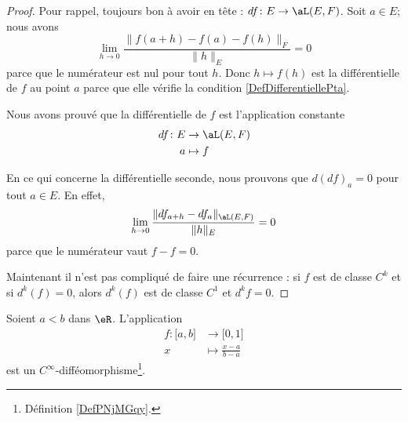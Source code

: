\begin{proof}
	Pour rappel, toujours bon à avoir en tête : \( df\colon E\to \aL(E,F)\). Soit \( a\in E\); nous avons
	\begin{equation}
		\lim_{h\to 0} \frac{ \| f(a+h)-f(a)- f(h) \|_F }{ \| h \|_E }=0
	\end{equation}
	parce que le numérateur est nul pour tout \( h\). Donc \( h\mapsto f(h)\) est la différentielle de \( f\) au point \( a\) parce que elle vérifie la condition \eqref{DefDifferentiellePta}.

	Nous avons prouvé que la différentielle de \( f\) est l'application constante
	\begin{equation}
		\begin{aligned}
			df\colon E & \to \aL(E,F) \\
			a          & \mapsto f
		\end{aligned}
	\end{equation}

	En ce qui concerne la différentielle seconde, nous prouvons que \( d(df)_a=0\) pour tout \( a\in E\). En effet,
	\begin{equation}
		\lim_{h\to 0} \frac{ \| df_{a+h}-df_a \|_{\aL(E,F)} }{ \| h \|_E }=0
	\end{equation}
	parce que le numérateur vaut \( f-f=0\).

	Maintenant il n'est pas compliqué de faire une récurrence : si \( f\) est de classe \( C^k\) et si \( d^k(f)=0\), alors \( d^k(f)\) est de classe \( C^1\) et \( d^kf=0\).
\end{proof}

\begin{lemma}       \label{LEMooAJDLooIPcmIV}
	Soient \( a<b\) dans \( \eR\). L'application
	\begin{equation}        \label{EQooIINJooAlSqKF}
		\begin{aligned}
			f\colon \mathopen[ a , b \mathclose] & \to \mathopen[ 0 , 1 \mathclose] \\
			x                                    & \mapsto \frac{ x-a }{ b-a }
		\end{aligned}
	\end{equation}
	est un \(  C^{\infty}\)-difféomorphisme\footnote{Définition \ref{DefPNjMGqy}.}.
\end{lemma}

